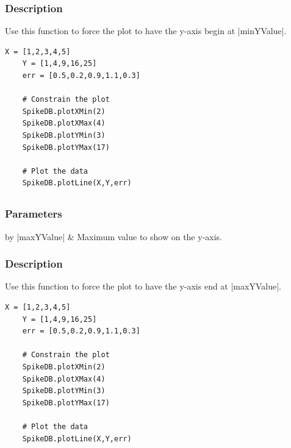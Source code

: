\documentclass{report}
\begin{document}
\subsubsection{Description}
Use this function to force the plot to have the y-axis begin at |minYValue|.
\begin{lstlisting}[caption=Example]
	X = [1,2,3,4,5]
	Y = [1,4,9,16,25]
	err = [0.5,0.2,0.9,1.1,0.3]

	# Constrain the plot
	SpikeDB.plotXMin(2)
	SpikeDB.plotXMax(4)
	SpikeDB.plotYMin(3)
	SpikeDB.plotYMax(17)

	# Plot the data
	SpikeDB.plotLine(X,Y,err)
\end{lstlisting}


\clearpage
\subsection[\method{void}{plotYMax}]{}
\subsubsection{Parameters}
\begin{table}[h]
\begin{center}
\begin{tabular}{by}
		|maxYValue| & Maximum value to show on the y-axis.\\
	\end{tabular}
\end{center}
\end{table}
\subsubsection{Description}
Use this function to force the plot to have the y-axis end at |maxYValue|.
\begin{lstlisting}[caption=Example]
	X = [1,2,3,4,5]
	Y = [1,4,9,16,25]
	err = [0.5,0.2,0.9,1.1,0.3]

	# Constrain the plot
	SpikeDB.plotXMin(2)
	SpikeDB.plotXMax(4)
	SpikeDB.plotYMin(3)
	SpikeDB.plotYMax(17)

	# Plot the data
	SpikeDB.plotLine(X,Y,err)
\end{lstlisting}


\clearpage

\clearpage
\subsection[\method{void}{setPointData}]{}
\end{document}
